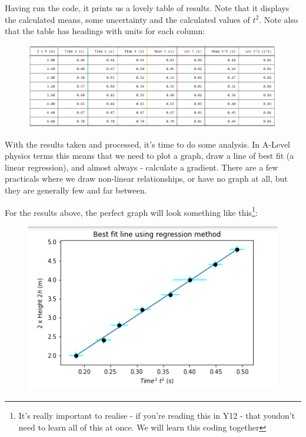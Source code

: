 \begin{fullwidth}
Having run the code, it prints us a lovely table of results. Note that it displays the calculated means, some uncertainty and the calculated values of $t^2$. Note also that the table has headings with units for each column: 
\begin{figure}
    \centering
    \includegraphics[width=1\linewidth]{figures/resultstable.png}
\end{figure}
\end{fullwidth}
With the results taken and processed, it's time to do some analysis. In A-Level physics terms this means that we need to plot a graph, draw a line of best fit (a linear regression), and almost always - calculate a gradient. There are a few practicals where we draw non-linear relationships, or have no graph at all, but they are generally few and far between. 

For the results above, the perfect graph will look something like this\footnote{It's really important to realise - if you're reading this in Y12 - that youdon't need to learn all of this at once. We will learn this coding together}: 
\begin{figure}
    \centering
    \includegraphics[width=1\linewidth]{figures/graphper.png}
\end{figure}

